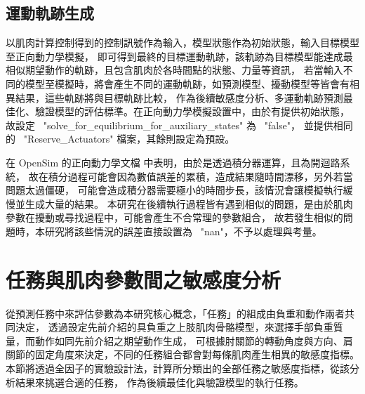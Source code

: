 \subsection{運動軌跡生成}
以肌肉計算控制得到的控制訊號作為輸入，模型狀態作為初始狀態，輸入目標模型至正向動力學模擬，
即可得到最終的目標運動軌跡，該軌跡為目標模型能達成最相似期望動作的軌跡，且包含肌肉於各時間點的狀態、力量等資訊，
若當輸入不同的模型至模擬時，將會產生不同的運動軌跡，如預測模型、擾動模型等皆會有相異結果，這些軌跡將與目標軌跡比較，
作為後續敏感度分析、多運動軌跡預測最佳化、驗證模型的評估標準。在正向動力學模擬設置中，由於有提供初始狀態，
故設定 \ "solve\_for\_equilibrium\_for\_auxiliary\_states" 為 \ "false"，
並提供相同的 \ "Reserve\_Actuators" 檔案，其餘則設定為預設。

\clearpage

在 OpenSim 的正向動力學文檔 \cite{opensim_fwd} 中表明，由於是透過積分器運算，且為開迴路系統，
故在積分過程可能會因為數值誤差的累積，造成結果隨時間漂移，另外若當問題太過僵硬，
可能會造成積分器需要極小的時間步長，該情況會讓模擬執行緩慢並生成大量的結果。
本研究在後續執行過程皆有遇到相似的問題，是由於肌肉參數在擾動或尋找過程中，可能會產生不合常理的參數組合，
故若發生相似的問題時，本研究將該些情況的誤差直接設置為 \ "nan"，不予以處理與考量。

\section{任務與肌肉參數間之敏感度分析}
從預測任務中來評估參數為本研究核心概念，「任務」的組成由負重和動作兩者共同決定，
透過設定先前介紹的具負重之上肢肌肉骨骼模型，來選擇手部負重質量，而動作如同先前介紹之期望動作生成，
可根據肘關節的轉動角度與方向、肩關節的固定角度來決定，不同的任務組合都會對每條肌肉產生相異的敏感度指標。
本節將透過全因子的實驗設計法，計算所分類出的全部任務之敏感度指標，從該分析結果來挑選合適的任務，
作為後續最佳化與驗證模型的執行任務。

